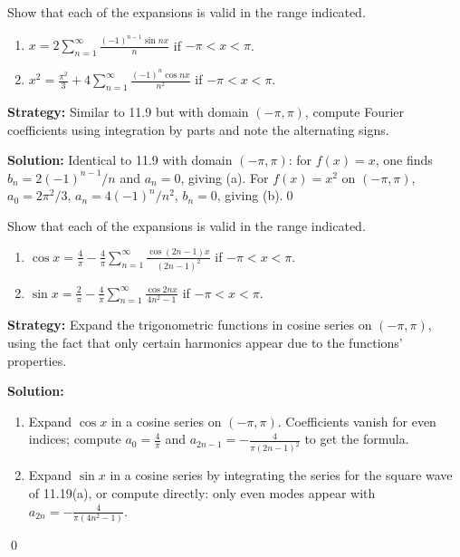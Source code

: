 \begin{problembox}
\begin{problemstatement}
Show that each of the expansions is valid in the range indicated.
\begin{enumerate}[label=(\alph*)]
\item $x = 2 \sum_{n=1}^\infty \frac{(-1)^{n-1} \sin nx}{n}$ if $-\pi < x < \pi$.
\item $x^2 = \frac{\pi^2}{3} + 4 \sum_{n=1}^\infty \frac{(-1)^n \cos nx}{n^2}$ if $-\pi < x < \pi$.
\end{enumerate}
\end{problemstatement}
\end{problembox}

\noindent\textbf{Strategy:} Similar to 11.9 but with domain $(-\pi,\pi)$, compute Fourier coefficients using integration by parts and note the alternating signs.

\bigskip\noindent\textbf{Solution:}
Identical to 11.9 with domain $(-\pi,\pi)$: for $f(x)=x$, one finds $b_n=2(-1)^{n-1}/n$ and $a_n=0$, giving (a). For $f(x)=x^2$ on $(-\pi,\pi)$, $a_0=2\pi^2/3$, $a_n=4(-1)^n/n^2$, $b_n=0$, giving (b).\qed


\begin{problembox}
\begin{problemstatement}
Show that each of the expansions is valid in the range indicated.
\begin{enumerate}[label=(\alph*)]
\item $\cos x = \frac{4}{\pi} - \frac{4}{\pi} \sum_{n=1}^\infty \frac{\cos (2n - 1)x}{(2n - 1)^2}$ if $-\pi < x < \pi$.
\item $\sin x = \frac{2}{\pi} - \frac{4}{\pi} \sum_{n=1}^\infty \frac{\cos 2nx}{4n^2 - 1}$ if $-\pi < x < \pi$.
\end{enumerate}
\end{problemstatement}
\end{problembox}

\noindent\textbf{Strategy:} Expand the trigonometric functions in cosine series on $(-\pi,\pi)$, using the fact that only certain harmonics appear due to the functions' properties.

\bigskip\noindent\textbf{Solution:}
\begin{enumerate}[label=(\alph*)]
\item Expand $\cos x$ in a cosine series on $(-\pi,\pi)$. Coefficients vanish for even indices; compute $a_0=\tfrac{4}{\pi}$ and $a_{2n-1}=-\tfrac{4}{\pi(2n-1)^2}$ to get the formula.
\item Expand $\sin x$ in a cosine series by integrating the series for the square wave of 11.19(a), or compute directly: only even modes appear with $a_{2n}= -\tfrac{4}{\pi(4n^2-1)}$.
\end{enumerate}\qed


